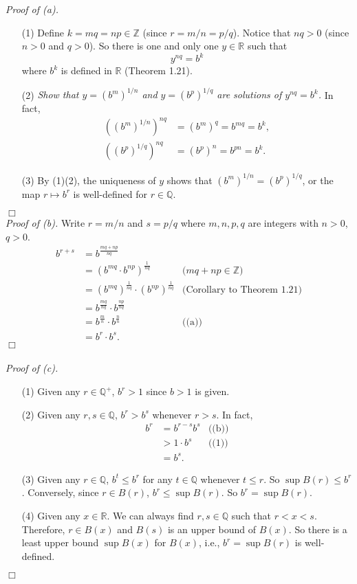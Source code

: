 \documentclass{article}
\begin{document}
\emph{Proof of (a).}
\begin{enumerate}
\item[(1)]
Define $k = mq = np \in \mathbb{Z}$ (since $r = m/n = p/q$).
Notice that $nq > 0$ (since $n>0$ and $q>0$).
So there is one and only one $y \in \mathbb{R}$ such that $$y^{nq} = b^k$$
where $b^k$ is defined in $\mathbb{R}$ (Theorem 1.21).
\item[(2)]
\emph{Show that $y = (b^m)^{1/n}$ and $y = (b^p)^{1/q}$
are solutions of $y^{nq} = b^k$.}
In fact,
\begin{align*}
((b^m)^{1/n})^{nq} &= (b^m)^q = b^{mq} = b^k, \\
((b^p)^{1/q})^{nq} &= (b^p)^n = b^{pn} = b^k.
\end{align*}
\item[(3)]
By (1)(2), the uniqueness of $y$ shows that $(b^m)^{1/n} = (b^p)^{1/q}$,
or the map $r \mapsto b^r$ is well-defined for $r \in \mathbb{Q}$.
\end{enumerate}
$\Box$ \\

\emph{Proof of (b).}
Write $r=m/n$ and $s=p/q$ where $m,n,p,q$ are integers with $n>0$, $q>0$.
\begin{align*}
b^{r+s}
&= b^{\frac{mq+np}{nq}} \\
&= (b^{mq} \cdot b^{np})^{\frac{1}{nq}}
  &\text{($mq+np \in \mathbb{Z}$)} \\
&= (b^{mq})^{\frac{1}{nq}} \cdot (b^{np})^{\frac{1}{nq}}
  &\text{(Corollary to Theorem 1.21)} \\
&= b^{\frac{mq}{nq}} \cdot b^{\frac{np}{nq}} \\
&= b^{\frac{m}{n}} \cdot b^{\frac{n}{n}}
  &\text{((a))} \\
&= b^r \cdot b^s.
\end{align*}
$\Box$ \\\\

\emph{Proof of (c).}
\begin{enumerate}
\item[(1)]
Given any $r \in \mathbb{Q}^+$, $b^r > 1$ since $b > 1$ is given.
\item[(2)]
Given any $r, s \in \mathbb{Q}$, $b^r > b^s$ whenever $r > s$.
In fact,
\begin{align*}
b^r
&= b^{r-s} b^s
  &\text{((b))} \\
&> 1 \cdot b^s
  &\text{((1))} \\
&= b^s.
\end{align*}
\item[(3)]
Given any $r \in \mathbb{Q}$, $b^t \leq b^r$ for any $t \in \mathbb{Q}$
whenever $t \leq r$.
So $\sup B(r) \leq b^r$.
Conversely, since $r \in B(r)$, $b^r \leq \sup B(r)$.
So $b^r = \sup B(r)$.
\item[(4)]
Given any $x \in \mathbb{R}$.
We can always find $r, s \in \mathbb{Q}$ such that $r < x < s$.
Therefore, $r \in B(x)$ and $B(s)$ is an upper bound of $B(x)$.
So there is a least upper bound $\sup B(x)$ for $B(x)$, i.e.,
$b^r = \sup B(r)$ is well-defined.
\end{enumerate}
$\Box$ \\
\end{document}
